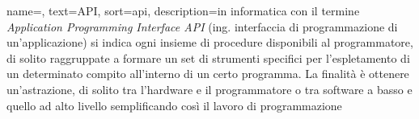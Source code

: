 
\renewcommand{\acronymname}{Acronimi e abbreviazioni}

\renewcommand{\glossaryname}{Glossario}

{
    name=,
    text=API,
    sort=api,
    description={in informatica con il termine \emph{Application Programming Interface API} (ing. interfaccia di programmazione di un'applicazione) si indica ogni insieme di procedure disponibili al programmatore, di solito raggruppate a formare un set di strumenti specifici per l'espletamento di un determinato compito all'interno di un certo programma. La finalità è ottenere un'astrazione, di solito tra l'hardware e il programmatore o tra software a basso e quello ad alto livello semplificando così il lavoro di programmazione}
}

